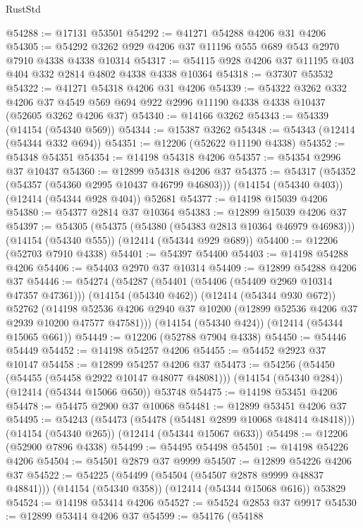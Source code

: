 \begin{lexlean}{RustStd}
\begin{coremodule}
@54288 := @17131 @53501
@54292 := @41271 @54288 @4206 @31 @4206
@54305 := @54292 @3262 @929 @4206 @37 @11196 @555 @689 @543 @2970 @7910 @4338 @4338 @10314
@54317 := @54115 @928 @4206 @37 @11195 @403 @404 @332 @2814 @4802 @4338 @4338 @10364
@54318 := @37307 @53532
@54322 := @41271 @54318 @4206 @31 @4206
@54339 := @54322
    @3262
    @332
    @4206
    @37
    @4549
    @569
    @694
    @922
    @2996
    @11190
    @4338
    @4338
    @10437
    (@52605 @3262 @4206 @37)
@54340 := @14166 @3262
@54343 := @54339 (@14154 (@54340 @569))
@54344 := @15387 @3262
@54348 := @54343 (@12414 (@54344 @332 @694))
@54351 := @12206 (@52622 @11190 @4338)
@54352 := @54348 @54351
@54354 := @14198 @54318 @4206
@54357 := @54354 @2996 @37 @10437
@54360 := @12899 @54318 @4206 @37
@54375 := @54317
    (@54352 (@54357 (@54360 @2995 @10437 @46799 @46803)))
    (@14154 (@54340 @403))
    (@12414 (@54344 @928 @404))
    @52681
@54377 := @14198 @15039 @4206
@54380 := @54377 @2814 @37 @10364
@54383 := @12899 @15039 @4206 @37
@54397 := @54305
    (@54375 (@54380 (@54383 @2813 @10364 @46979 @46983)))
    (@14154 (@54340 @555))
    (@12414 (@54344 @929 @689))
@54400 := @12206 (@52703 @7910 @4338)
@54401 := @54397 @54400
@54403 := @14198 @54288 @4206
@54406 := @54403 @2970 @37 @10314
@54409 := @12899 @54288 @4206 @37
@54446 := @54274
    (@54287
      (@54401 (@54406 (@54409 @2969 @10314 @47357 @47361)))
      (@14154 (@54340 @462))
      (@12414 (@54344 @930 @672))
      @52762
      (@14198 @52536 @4206 @2940 @37 @10200 (@12899 @52536 @4206 @37 @2939 @10200 @47577 @47581)))
    (@14154 (@54340 @424))
    (@12414 (@54344 @15065 @661))
@54449 := @12206 (@52788 @7904 @4338)
@54450 := @54446 @54449
@54452 := @14198 @54257 @4206
@54455 := @54452 @2923 @37 @10147
@54458 := @12899 @54257 @4206 @37
@54473 := @54256
    (@54450 (@54455 (@54458 @2922 @10147 @48077 @48081)))
    (@14154 (@54340 @284))
    (@12414 (@54344 @15066 @650))
    @53748
@54475 := @14198 @53451 @4206
@54478 := @54475 @2900 @37 @10068
@54481 := @12899 @53451 @4206 @37
@54495 := @54243
    (@54473 (@54478 (@54481 @2899 @10068 @48414 @48418)))
    (@14154 (@54340 @265))
    (@12414 (@54344 @15067 @633))
@54498 := @12206 (@52900 @7896 @4338)
@54499 := @54495 @54498
@54501 := @14198 @54226 @4206
@54504 := @54501 @2879 @37 @9999
@54507 := @12899 @54226 @4206 @37
@54522 := @54225
    (@54499 (@54504 (@54507 @2878 @9999 @48837 @48841)))
    (@14154 (@54340 @358))
    (@12414 (@54344 @15068 @616))
    @53829
@54524 := @14198 @53414 @4206
@54527 := @54524 @2853 @37 @9917
@54530 := @12899 @53414 @4206 @37
@54599 := @54176
    (@54188

\end{coremodule}
\end{lexlean}
